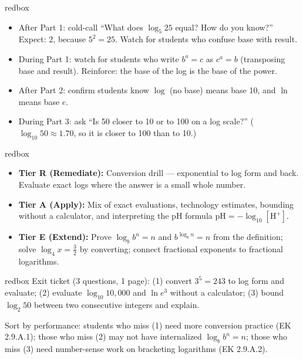 \documentclass[10pt]{article}
\begin{document}
\begin{skillbox}{redbox}
\begin{itemize}[leftmargin=1.2em,itemsep=2pt,topsep=0pt]
  \item After Part 1: cold-call ``What does $\log_5 25$ equal? How do you know?''
        Expect: 2, because $5^2 = 25$. Watch for students who confuse base with result.
  \item During Part 1: watch for students who write $b^a = c$ as $c^a = b$ (transposing base
        and result). Reinforce: the base of the log is the base of the power.
  \item After Part 2: confirm students know $\log$ (no base) means base 10, and $\ln$ means base $e$.
  \item During Part 3: ask ``Is 50 closer to 10 or to 100 on a log scale?''
        ($\log_{10} 50 \approx 1.70$, so it is closer to 100 than to 10.)
\end{itemize}
\end{skillbox}

\begin{skillbox}{redbox}
\begin{itemize}[leftmargin=1.2em,itemsep=2pt,topsep=0pt]
  \item \textbf{Tier R (Remediate):} Conversion drill --- exponential to log form and back.
        Evaluate exact logs where the answer is a small whole number.
  \item \textbf{Tier A (Apply):} Mix of exact evaluations, technology estimates, bounding
        without a calculator, and interpreting the pH formula $\text{pH} = -\log_{10}[\text{H}^+]$.
  \item \textbf{Tier E (Extend):} Prove $\log_b b^n = n$ and $b^{\log_b n} = n$ from the
        definition; solve $\log_4 x = \tfrac{3}{2}$ by converting; connect fractional exponents
        to fractional logarithms.
\end{itemize}
\end{skillbox}

\begin{skillbox}{redbox}
Exit ticket (3 questions, 1 page): (1) convert $3^5 = 243$ to log form and evaluate;
(2) evaluate $\log_{10} 10{,}000$ and $\ln e^3$ without a calculator;
(3) bound $\log_2 50$ between two consecutive integers and explain.

Sort by performance: students who miss (1) need more conversion practice (EK 2.9.A.1);
those who miss (2) may not have internalized $\log_b b^n = n$; those who miss (3) need
number-sense work on bracketing logarithms (EK 2.9.A.2).
\end{skillbox}
\end{document}

